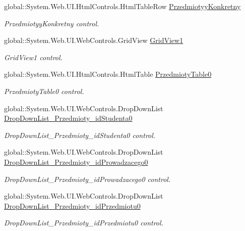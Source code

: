 \begin{DoxyCompactItemize}
global\+::\+System.\+Web.\+U\+I.\+Html\+Controls.\+Html\+Table\+Row \hyperlink{class_dziennik_ocen_web2_1_1_web_form1_ab1eb7a8ef1345e0e57b0f969dfa07e85}{Przedmiotyy\+Konkretny}
\begin{DoxyCompactList}\small\item\em Przedmiotyy\+Konkretny control. \end{DoxyCompactList}\item 
global\+::\+System.\+Web.\+U\+I.\+Web\+Controls.\+Grid\+View \hyperlink{class_dziennik_ocen_web2_1_1_web_form1_abf211c7946ad1b40a27598c4ad2cbed2}{Grid\+View1}
\begin{DoxyCompactList}\small\item\em Grid\+View1 control. \end{DoxyCompactList}\item 
global\+::\+System.\+Web.\+U\+I.\+Html\+Controls.\+Html\+Table \hyperlink{class_dziennik_ocen_web2_1_1_web_form1_ae07ff54c565a4fd8deaa4b074af896cf}{Przedmioty\+Table0}
\begin{DoxyCompactList}\small\item\em Przedmioty\+Table0 control. \end{DoxyCompactList}\item 
global\+::\+System.\+Web.\+U\+I.\+Web\+Controls.\+Drop\+Down\+List \hyperlink{class_dziennik_ocen_web2_1_1_web_form1_aeb8404dae73cca5377a5bc6e86629837}{Drop\+Down\+List\+\_\+\+Przedmioty\+\_\+id\+Studenta0}
\begin{DoxyCompactList}\small\item\em Drop\+Down\+List\+\_\+\+Przedmioty\+\_\+id\+Studenta0 control. \end{DoxyCompactList}\item 
global\+::\+System.\+Web.\+U\+I.\+Web\+Controls.\+Drop\+Down\+List \hyperlink{class_dziennik_ocen_web2_1_1_web_form1_aa5510d7e77e936fa64b1f15ee29388ea}{Drop\+Down\+List\+\_\+\+Przedmioty\+\_\+id\+Prowadzacego0}
\begin{DoxyCompactList}\small\item\em Drop\+Down\+List\+\_\+\+Przedmioty\+\_\+id\+Prowadzacego0 control. \end{DoxyCompactList}\item 
global\+::\+System.\+Web.\+U\+I.\+Web\+Controls.\+Drop\+Down\+List \hyperlink{class_dziennik_ocen_web2_1_1_web_form1_a1db4ed91510910999787a86606986523}{Drop\+Down\+List\+\_\+\+Przedmioty\+\_\+id\+Przedmiotu0}
\begin{DoxyCompactList}\small\item\em Drop\+Down\+List\+\_\+\+Przedmioty\+\_\+id\+Przedmiotu0 control. \end{DoxyCompactList}\item 

\end{DoxyCompactItemize}
